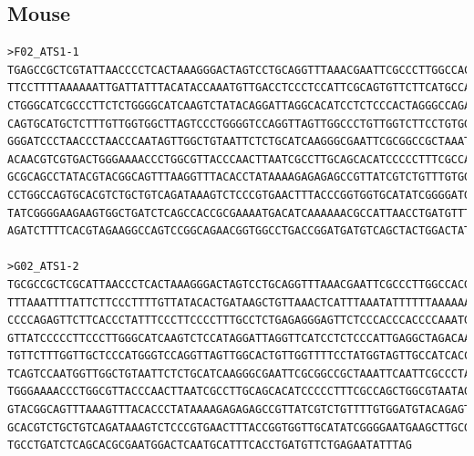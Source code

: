 \subsection{Mouse}
\begingroup\tiny
\begin{verbatim}
>F02_ATS1-1
TGAGCCGCTCGTATTAACCCCTCACTAAAGGGACTAGTCCTGCAGGTTTAAACGAATTCGCCCTTGGCCACGCGTCGACTAGTACTTTTTTTTTTTTTTTTTTCATTTAAAATTTATTTT
TTCCTTTTAAAAAATTGATTATTTACATACCAAATGTTGACCTCCCTCCATTCGCAGTGTTCTTCATGCCATCCCCTTCCCTTCACCTCACCTCTGAAAGAGTGCCTTCCATCCCAACCC
CTGGGCATCGCCCTTCTCTGGGGCATCAAGTCTATACAGGATTAGGCACATCCTCTCCCACTAGGGCCAGATTAGGCTGTCAGTCCTTAGCTATGTATGTGCTGGGAGCCTTAGACCAGC
CAGTGCATGCTCTTTGTTGGTGGCTTAGTCCCTGGGGTCCAGGTTAGTTGGCCCTGTTGGTCTTCCTGTGGGATTGCAATCCCCTTCAGTTCCTTCAGCCTTTCCCCTAACTCTTCCATA
GGGATCCCTAACCCTAACCCAATAGTTGGCTGTAATTCTCTGCATCAAGGGCGAATTCGCGGCCGCTAAATTCAATTCGCCCTATAGTGAGTCGTATTACAATTCACTGGCCGTCGTTTT
ACAACGTCGTGACTGGGAAAACCCTGGCGTTACCCAACTTAATCGCCTTGCAGCACATCCCCCTTTCGCCAGCTGGCGTAATAGCGAAGAGGCCCGCACCGATCGCCCTTCCCAACAGTT
GCGCAGCCTATACGTACGGCAGTTTAAGGTTTACACCTATAAAAGAGAGAGCCGTTATCGTCTGTTTGTGGATGTACAGAGTGATATTATTGACACGCCGGGGCGACGGATGGTGATCCC
CCTGGCCAGTGCACGTCTGCTGTCAGATAAAGTCTCCCGTGAACTTTACCCGGTGGTGCATATCGGGGATGAAAGCTGGCGCATGATGACCACCGATATGGCCAGTGTGCCGGTCTCCGT
TATCGGGGAAGAAGTGGCTGATCTCAGCCACCGCGAAAATGACATCAAAAAACGCCATTAACCTGATGTTTCTGGGGAATAATAAATGTCAGCATGAGATTATCAAAGGATTCTCACCTT
AGATCTTTTCACGTAGAAGGCCAGTCCGGCAGAACGGTGGCCTGACCGGATGATGTCAGCTACTGGACTATCCTGGCAACAAAGA

>G02_ATS1-2
TGCGCCGCTCGCATTAACCCTCACTAAAGGGACTAGTCCTGCAGGTTTAAACGAATTCGCCCTTGGCCACGCGTCGACTAGTACTTTTTTTTTTTTTTTTTTGGTTTTTTAATAATTTAT
TTTAAATTTTATTCTTCCCTTTTGTTATACACTGATAAGCTGTTAAACTCATTTAAATATTTTTTAAAAAATTATTTTATCTATTTGCATTCCAAATCTTGTTCCTCCTCCTGGTCTTCC
CCCCAGAGTTCTTCACCCTATTTCCCTTCCCCTTTGCCTCTGAGAGGGAGTTCTCCCACCCACCCCAAATGACCCACCCACCCATCCCCACCTCACCTCACTTTACTGCCCCATCCCTGG
GTTATCCCCCTTCCCTTGGGCATCAAGTCTCCATAGGATTAGGTTCATCCTCTCCCATTGAGGCTAGACAAAGCAGTTCTCTGCTACATATATGCCAGGGGCCATGGGCCAGTCCATGTA
TGTTCTTTGGTTGCTCCCATGGGTCCAGGTTAGTTGGCACTGTTGGTTTTCCTATGGTAGTTGCCATCACCTTCAGTTCTTTCAATCCTTCATCCAACTCTTCCATAGGGGTGTCCAACC
TCAGTCCAATGGTTGGCTGTAATTCTCTGCATCAAGGGCGAATTCGCGGCCGCTAAATTCAATTCGCCCTATAGTGAGTCGTATTACAATTCACTGGCCGTCGTTTTACAACGTCGTGAC
TGGGAAAACCCTGGCGTTACCCAACTTAATCGCCTTGCAGCACATCCCCCTTTCGCCAGCTGGCGTAATAGCGAAGAGGCCCGCACCGATCGCCCTTCCCAACAGTTGCGCAGCCTATAC
GTACGGCAGTTTAAAGTTTACACCCTATAAAAGAGAGAGCCGTTATCGTCTGTTTTGTGGATGTACAGAGTGATATTTATTGACACGCCGGGGCGACGGATGGTGATCCCCCTGGCCAGT
GCACGTCTGCTGTCAGATAAAGTCTCCCGTGAACTTTACCGGTGGTTGCATATCGGGGAATGAAGCTTGCGCATGATGACCAACGATATGCCAGTGTGCCAGTCTCGTTATCGGGAGGAG
TGCCTGATCTCAGCACGCGAATGGACTCAATGCATTTCACCTGATGTTCTGAGAATATTTAG


\end{verbatim}
